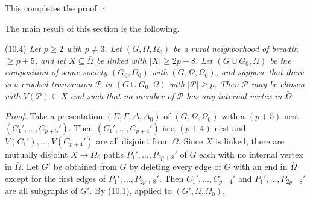 This completes the proof. $\square$

The main result of this section is the following.

\stmt
(10.4) \textit{Let $p \ge 2$ with $p \ne 3$. Let $(G, \Omega, \Omega_0)$ be a rural neighborhood of breadth $\ge p + 5$, and let $X \subseteq \bar{\Omega}$ be linked with $|X| \ge 2p + 8$. Let $(G \cup G_0, \Omega)$ be the composition of some society $(G_0, \Omega_0)$ with $(G, \Omega, \Omega_0)$, and suppose that there is a crooked transaction $\mathscr{P}$ in $(G \cup G_0, \Omega)$ with $|\mathscr{P}| \ge p$. Then $\mathscr{P}$ may be chosen with $V(\mathscr{P}) \subseteq X$ and such that no member of $\mathscr{P}$ has any internal vertex in $\bar{\Omega}$.}

\textit{Proof.} Take a presentation $(\Sigma, \Gamma, \Delta, \Delta_0)$ of $(G, \Omega, \Omega_0)$ with a $(p + 5)$-nest $(C_1', \dots, C_{p+5}')$. Then $(C_1', \dots, C_{p+4}')$ is a $(p + 4)$-nest and $V(C_1'), \dots, V(C_{p+4}')$ are all disjoint from $\bar{\Omega}$. Since $X$ is linked, there are mutually disjoint $X \to \bar{\Omega}_0$ paths $P_1', \dots, P_{2p+8}'$ of $G$ each with no internal vertex in $\bar{\Omega}$. Let $G'$ be obtained from $G$ by deleting every edge of $G$ with an end in $\bar{\Omega}$ except for the first edges of $P_1', \dots, P_{2p+8}'$. Then $C_1', \dots, C_{p+4}'$ and $P_1', \dots, P_{2p+8}'$ are all subgraphs of $G'$. By (10.1), applied to $(G', \Omega, \Omega_0)$,

